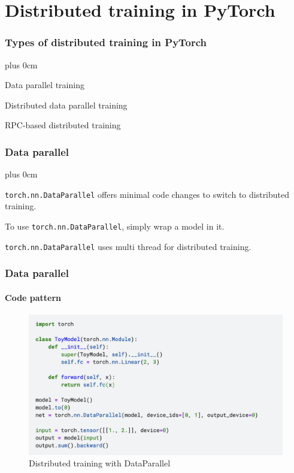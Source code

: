 \documentclass[11pt]{beamer}
\renewcommand{\raggedright}{\leftskip=0pt \rightskip=0pt plus 0cm}
\let\olditemize=\itemize
\renewenvironment{itemize}{\olditemize\raggedright}{\endlist}
\begin{document}
\begin{frame}
\begin{columns}[c]
\begin{column}{.5\textwidth}
\begin{figure}[!h]
\end{figure}
\end{column}
\end{columns}
\end{frame}
\section{Distributed training in PyTorch}
\frame{\tableofcontents[currentsection]}
\begin{frame}
\frametitle{Types of distributed training in PyTorch}
\begin{itemize}
	\item Data parallel training
	\item Distributed data parallel training
	\item RPC-based distributed training
\end{itemize}
\end{frame}
\begin{frame}
\frametitle{Data parallel}
\begin{itemize}
	\item \texttt{torch.nn.DataParallel} offers minimal code changes to switch to distributed training.
	\item To use \texttt{torch.nn.DataParallel}, simply wrap a model in it.
	\item \texttt{torch.nn.DataParallel} uses multi thread for distributed training.
\end{itemize}
\end{frame}
\begin{frame}
\frametitle{Data parallel}
\framesubtitle{Code pattern}
\begin{figure}[!h]
\centering
\caption{Distributed training with DataParallel}
\includegraphics[scale=0.3]{images/code/torch-data-par.png}
\end{figure}
\end{frame}
\end{document}
